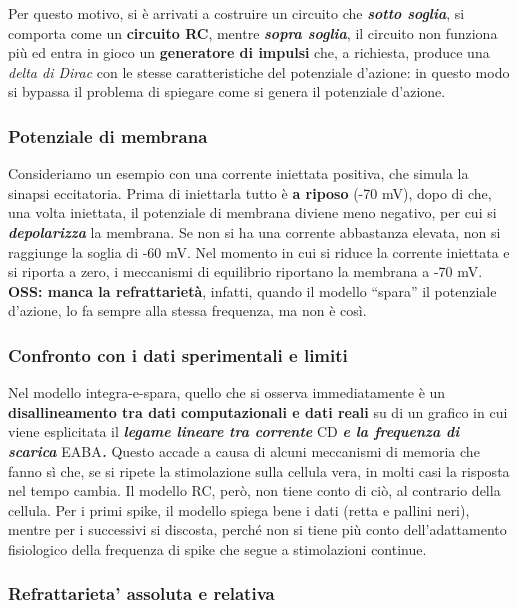 \documentclass[12pt,a4paper,openany]{book}
\begin{document}
Per questo motivo, si è arrivati a costruire un circuito che \textbf{\textit{sotto soglia}}, si comporta come un \textbf{circuito RC}, mentre \textbf{\textit{sopra soglia}}, il circuito non funziona più ed entra in gioco un \textbf{generatore di impulsi }che, a richiesta, produce una \textit{delta di Dirac }con le stesse caratteristiche del potenziale d'azione: in questo modo si bypassa il problema di spiegare come si genera il potenziale d'azione.

\subsubsection{Potenziale di membrana}

Consideriamo un esempio con una corrente iniettata positiva, che simula la sinapsi eccitatoria. Prima di iniettarla tutto è \textbf{a riposo }(-70 mV), dopo di che, una volta iniettata, il potenziale di membrana diviene meno negativo, per cui si \textbf{\textit{depolarizza }}la
membrana. Se non si ha una corrente abbastanza elevata, non si raggiunge la soglia di -60 mV. Nel momento in cui si riduce la corrente iniettata e si riporta a zero, i meccanismi di equilibrio riportano la membrana a -70 mV.
\textbf{OSS: manca la refrattarietà}, infatti, quando il modello ``spara'' il potenziale d'azione, lo fa sempre alla stessa frequenza, ma non è così.

\subsubsection{Confronto con i dati sperimentali e limiti}

Nel modello integra-e-spara, quello che si osserva immediatamente è un \textbf{disallineamento tra dati computazionali e dati reali }su di un grafico in cui viene esplicitata il \textbf{\textit{legame lineare tra corrente }}CD \textbf{\textit{e la frequenza di scarica }}EABA\textbf{\textit{.}}
Questo accade a causa di alcuni meccanismi di memoria che fanno sì che, se si ripete la stimolazione sulla cellula vera, in
molti casi la risposta nel tempo cambia. Il modello RC, però, non tiene conto di ciò, al contrario della cellula.
Per i primi spike, il modello spiega bene i dati (retta e pallini neri), mentre per i successivi si discosta, perché non si tiene più conto dell'adattamento fisiologico della frequenza di spike che segue a stimolazioni continue.

\subsubsection{Refrattarieta' assoluta e relativa}
\end{document}
